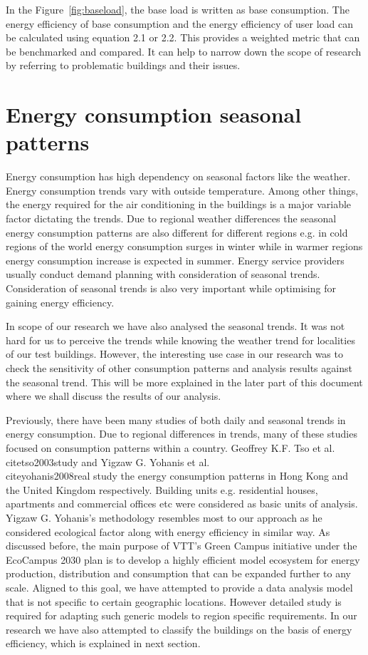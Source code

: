 In the Figure~\ref{fig:baseload}, the base load is written as base consumption. The energy efficiency of base consumption and the energy efficiency of user load can be calculated using equation 2.1 or 2.2. This provides a weighted metric that can be benchmarked and compared. It can help to narrow down the scope of research by referring to problematic buildings and their issues.

\section{Energy consumption seasonal patterns}\label{seasonal}
Energy consumption has high dependency on seasonal factors like the weather. Energy consumption trends vary with outside temperature. Among other things, the energy required for the air conditioning in the buildings is a major variable factor dictating the trends. Due to regional weather differences the seasonal energy consumption patterns are also different for different regions e.g. in cold regions of the world energy consumption surges in winter while in warmer regions energy consumption increase is expected in summer. Energy service providers usually conduct demand planning with consideration of seasonal trends. Consideration of seasonal trends is also very important while optimising for gaining energy efficiency. 

In scope of our research we have also analysed the seasonal trends. It was not hard for us to perceive the trends while knowing the weather trend for localities of our test buildings. However, the interesting use case in our research was to check the sensitivity of other consumption patterns and analysis results against the seasonal trend. This will be more explained in the later part of this document where we shall discuss the results of our analysis.

Previously, there have been many studies of both daily and seasonal trends in energy consumption. Due to regional differences in trends, many of these studies focused on consumption patterns within a country. Geoffrey K.F. Tso et al.\ \\cite{tso2003study} and Yigzaw G. Yohanis et al.\ \\cite{yohanis2008real} study the energy consumption patterns in  Hong Kong and the United Kingdom respectively. Building units e.g. residential houses, apartments and commercial offices etc were considered as basic units of analysis. Yigzaw G. Yohanis's methodology resembles most to our approach as he considered ecological factor along with energy efficiency in similar way. As discussed before, the main purpose of VTT's Green Campus initiative under the EcoCampus 2030 plan is to develop a highly efficient model ecosystem for energy production, distribution and consumption that can be expanded further to any scale. Aligned to this goal, we have attempted to provide a data analysis model that is not specific to certain geographic locations. However detailed study is required for adapting such generic models to region specific requirements. In our research we have also attempted to classify the buildings on the basis of energy efficiency, which is explained in next section.

